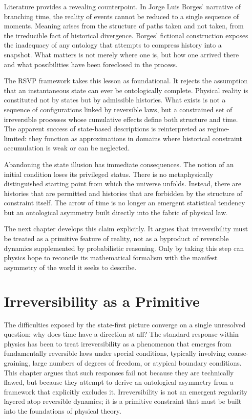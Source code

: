 \documentclass[11pt,oneside]{book}
\begin{document}
Literature provides a revealing counterpoint. In Jorge Luis Borges’ narrative of branching time, the reality of events cannot be reduced to a single sequence of moments. Meaning arises from the structure of paths taken and not taken, from the irreducible fact of historical divergence. Borges’ fictional construction exposes the inadequacy of any ontology that attempts to compress history into a snapshot. What matters is not merely where one is, but how one arrived there and what possibilities have been foreclosed in the process.

The RSVP framework takes this lesson as foundational. It rejects the assumption that an instantaneous state can ever be ontologically complete. Physical reality is constituted not by states but by admissible histories. What exists is not a sequence of configurations linked by reversible laws, but a constrained set of irreversible processes whose cumulative effects define both structure and time. The apparent success of state-based descriptions is reinterpreted as regime-limited: they function as approximations in domains where historical constraint accumulation is weak or can be neglected.

Abandoning the state illusion has immediate consequences. The notion of an initial condition loses its privileged status. There is no metaphysically distinguished starting point from which the universe unfolds. Instead, there are histories that are permitted and histories that are forbidden by the structure of constraint itself. The arrow of time is no longer an emergent statistical tendency but an ontological asymmetry built directly into the fabric of physical law.

The next chapter develops this claim explicitly. It argues that irreversibility must be treated as a primitive feature of reality, not as a byproduct of reversible dynamics supplemented by probabilistic reasoning. Only by taking this step can physics hope to reconcile its mathematical formalism with the manifest asymmetry of the world it seeks to describe.

\chapter{Irreversibility as a Primitive}

The difficulties exposed by the state-first picture converge on a single unresolved question: why does time have a direction at all? The standard response within physics has been to treat irreversibility as a phenomenon that emerges from fundamentally reversible laws under special conditions, typically involving coarse-graining, large numbers of degrees of freedom, or atypical boundary conditions. This chapter argues that such responses fail not because they are technically flawed, but because they attempt to derive an ontological asymmetry from a framework that explicitly excludes it. Irreversibility is not an emergent regularity layered atop reversible dynamics; it is a primitive constraint that must be built into the foundations of physical theory.
\end{document}
